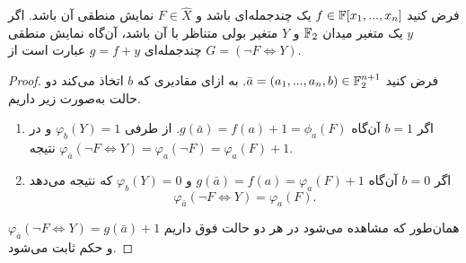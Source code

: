\begin{lemma}
\label{lemma2}
فرض کنید 
$f\in\mathbb{F}[x_{1},...,x_{n}]$
یک چندجمله‌ای باشد و 
$F\in\widehat{X}$
نمایش منطقی آن باشد. اگر 
$y$
یک متغیر میدان 
$\mathbb{F}_{2}$
و 
$Y$
متغیر بولی متناظر با آن باشد، آن‌گاه نمایش منطقی چندجمله‌ای 
$g = f + y$
عبارت‌ است از
$G = (\neg F\iff Y)$.
\end{lemma}
\begin{proof}
فرض کنید 
$\bar{a} = (a_{1},...,a_{n},b)\in\mathbb{F}_{2}^{n+1}$. 
به ازای مقادیری که 
$b$
اتخاذ می‌کند دو حالت به‌صورت زیر داریم.
\begin{enumerate}
\item 
اگر 
$b = 1$
آن‌گاه 
$g(\bar{a}) = f(a) + 1 = \phi_{a}(F)$. 
از طرفی 
$\varphi_{b}(Y) = 1$
و در نتیجه 
$\varphi_{\bar{a}}(\neg F\iff Y) = \varphi_{a}(\neg F) = \varphi_{a}(F) + 1$.
\item 
اگر 
$b = 0$
آن‌گاه 
$g(\bar{a}) = f(a) = \varphi_{a}(F) + 1$
و 
$\varphi_{b}(Y) = 0$
که نتیجه می‌دهد 
\begin{equation*}
\varphi_{\bar{a}}(\neg F\iff Y) = \varphi_{a}(F).
\end{equation*}
\end{enumerate}
همان‌طور که مشاهده می‌شود در هر دو حالت فوق داریم 
$\varphi_{\bar{a}}(\neg F\iff Y) = g(\bar{a}) + 1$
و حکم ثابت می‌شود. 
\end{proof}

